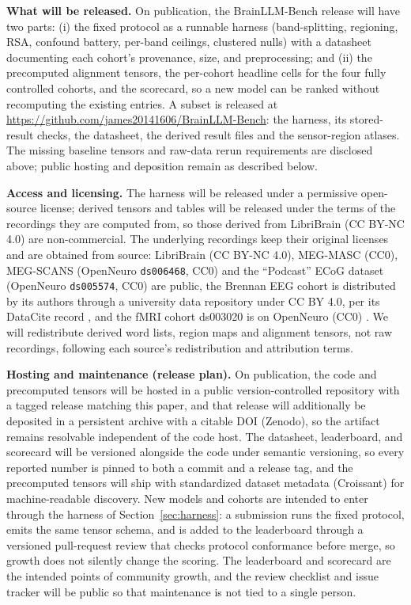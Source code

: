 \documentclass{article}
\newcommand{\coderepo}{\url{https://github.com/james20141606/BrainLLM-Bench}}
\begin{document}
\textbf{What will be released.} On publication, the BrainLLM-Bench release will have two parts: (i) the
fixed protocol as a runnable harness (band-splitting, regioning, RSA,
confound battery, per-band ceilings, clustered nulls) with a datasheet
documenting each cohort's provenance, size, and preprocessing; and (ii) the
precomputed alignment tensors, the per-cohort headline cells for the four fully controlled
cohorts, and the scorecard, so a new model can be ranked without recomputing the existing entries.
A subset is released at \coderepo: the harness, its
stored-result checks, the datasheet, the derived result files and the sensor-region atlases.
The missing baseline tensors and raw-data rerun requirements are disclosed above; public hosting
and deposition remain as described below.

\textbf{Access and licensing.} The harness will be released under a permissive open-source
license; derived tensors and tables will be released under the terms of the recordings they are
computed from, so those derived from LibriBrain (CC BY-NC 4.0) are non-commercial. The underlying
recordings keep their original licenses and are obtained from source: LibriBrain (CC BY-NC 4.0),
MEG-MASC (CC0), MEG-SCANS (OpenNeuro \texttt{ds006468}, CC0) and the ``Podcast'' ECoG
dataset (OpenNeuro \texttt{ds005574}, CC0) are public, the Brennan EEG cohort is distributed by
its authors through a university data repository under CC BY 4.0, per its DataCite record \citep{brennan2018alice}, and the fMRI cohort
ds003020 is on OpenNeuro (CC0) \citep{lebel2026openneuro}. We will redistribute derived word
lists, region maps and alignment tensors, not raw recordings, following each source's
redistribution and attribution terms.

\textbf{Hosting and maintenance (release plan).} On publication, the code and
precomputed tensors will be hosted in a public version-controlled repository with a
tagged release matching this paper, and that release will additionally be deposited
in a persistent archive with a citable DOI (Zenodo), so the artifact remains
resolvable independent of the code host. The datasheet, leaderboard, and scorecard will be versioned alongside the
code under semantic versioning, so every reported number is pinned to both a commit
and a release tag, and the precomputed tensors will ship with standardized dataset
metadata (Croissant) for machine-readable discovery. New models and cohorts are
intended to enter through the harness of Section~\ref{sec:harness}: a submission runs
the fixed protocol, emits the same tensor schema, and is added to the leaderboard
through a versioned pull-request review that checks protocol conformance before
merge, so growth does not silently change the scoring. The leaderboard and scorecard
are the intended points of community growth, and the review checklist and issue
tracker will be public so that maintenance is not tied to a single person.
\end{document}
